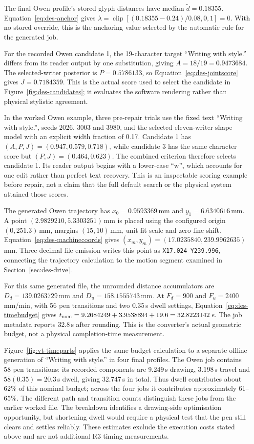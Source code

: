 The final Owen profile's stored glyph distances have median $\widetilde d=0.18355$. Equation~\ref{eq:des-anchor} gives $\lambda=\operatorname{clip}[(0.18355-0.24)/0.08,0,1]=0$. With no stored override, this is the anchoring value selected by the automatic rule for the generated job.

For the recorded Owen candidate 1, the 19-character target ``Writing with style.'' differs from its reader output by one substitution, giving $A=18/19=0.9473684$. The selected-writer posterior is $P=0.5786133$, so Equation~\ref{eq:des-jointscore} gives $J=0.7184359$. This is the actual score used to select the candidate in Figure~\ref{fig:des-candidates}; it evaluates the software rendering rather than physical stylistic agreement.

In the worked Owen example, three pre-repair trials use the fixed text ``Writing with style.'', seeds 2026, 3003 and 3980, and the selected eleven-writer shape model with an explicit width fraction of 0.17. Candidate 1 has $(A,P,J)=(0.947,0.579,0.718)$, while candidate 3 has the same character score but $(P,J)=(0.464,0.623)$. The combined criterion therefore selects candidate 1. Its reader output begins with a lower-case ``w'', which accounts for one edit rather than perfect text recovery. This is an inspectable scoring example before repair, not a claim that the full default search or the physical system attained those scores.

The generated Owen trajectory has $x_0=0.9593369$\,mm and $y_1=6.6340616$\,mm. A point $(2.9829210,5.3303251)$\,mm is placed using the configured origin $(0,251.3)$\,mm, margins $(15,10)$\,mm, unit fit scale and zero line shift. Equation~\ref{eq:des-machinecoords} gives $(x_m,y_m)=(17.0235840,239.9962635)$\,mm. Three-decimal file emission writes this point as \texttt{X17.024 Y239.996}, connecting the trajectory calculation to the motion segment examined in Section~\ref{sec:des-drive}.

For this same generated file, the unrounded distance accumulators are $D_d=139.0263729$\,mm and $D_u=158.1555743$\,mm. At $F_d=900$ and $F_u=2400$\,mm/min, with 56 pen transitions and two 0.35\,s dwell settings, Equation~\ref{eq:des-timebudget} gives $t_{\rm nom}=9.2684249+3.9538894+19.6=32.8223142$\,s. The job metadata reports 32.8\,s after rounding. This is the converter's actual geometric budget, not a physical completion-time measurement.

Figure~\ref{fig:vt-timeparts} applies the same budget calculation to a separate offline generation of ``Writing with style.'' in four final profiles. The Owen job contains 58 pen transitions: its recorded components are 9.249\,s drawing, 3.198\,s travel and $58(0.35)=20.3$\,s dwell, giving 32.747\,s in total. Thus dwell contributes about 62\% of this nominal budget; across the four jobs it contributes approximately 61--65\%. The different path and transition counts distinguish these jobs from the earlier worked file. The breakdown identifies a drawing-side optimisation opportunity, but shortening dwell would require a physical test that the pen still clears and settles reliably. These estimates exclude the execution costs stated above and are not additional R3 timing measurements.


